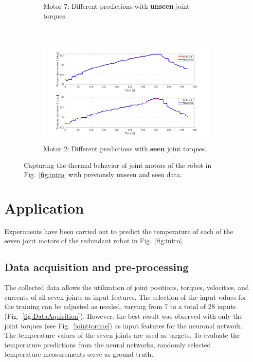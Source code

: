 \documentclass{ifacconf}
\begin{document}
\begin{figure}[t!]
\begin{subfigure}[t]{\columnwidth}
		\caption{Motor 7: Different predictions with \textbf{unseen} joint torques.}
	\end{subfigure}
	~
	\begin{subfigure}[t]{\columnwidth}
		\includegraphics[height=2.1in]{./pictures/applications/J2.png}
		\caption{Motor 2: Different predictions with \textbf{seen} joint torques.}
	\end{subfigure}
	\caption{Capturing the thermal behavior of joint motors of the robot in Fig.~\ref{fig:intro} with previously unseen and seen data.}
	\label{sevenjoint}
\end{figure}


\section{Application}
Experiments have been carried out to predict the temperature of each of the seven joint motors of the redundant robot in Fig.~\ref{fig:intro}. 


\subsection{Data acquisition and pre-processing}
The collected data allows the utilization of joint positions, torques, velocities, and currents of all seven joints as input features.
The selection of the input values for the training can be adjusted as needed, varying from 7 to a total of 28 inputs (Fig.~\ref{fig:DataAquisition}). However, the best result was observed with only the joint torques (see Fig.~\ref{jointtorque}) as input features for the neuronal network. The temperature values of the seven joints are used as targets.
To evaluate the temperature predictions from the neural networks, randomly selected temperature measurements serve as ground truth.
\end{document}
